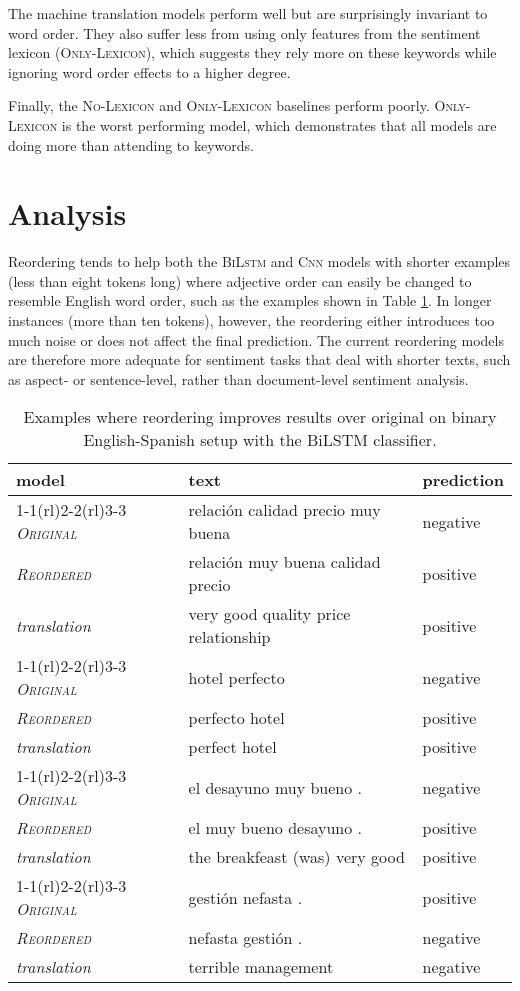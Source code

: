 \documentclass[11pt,a4paper]{article}
\newcommand{\original}{\textsc{Original}\xspace}
\newcommand{\mtreordered}{\textsc{Reordered}\xspace}
\newcommand{\onlylex}{\textsc{Only-Lexicon}\xspace}
\newcommand{\nolex}{\textsc{No-Lexicon}\xspace}
\newcommand{\bilstm}{\textsc{BiLstm}\xspace}
\newcommand{\cnn}{\textsc{Cnn}\xspace}
\begin{document}
The machine translation models perform well but are surprisingly invariant to word order. They also suffer less from using only features from the sentiment lexicon (\onlylex), which suggests they rely more on these keywords while ignoring word order effects to a higher degree.

Finally, the \nolex and \onlylex baselines perform poorly. \onlylex is the worst performing model, which demonstrates that all models are doing more than attending to keywords.



\section{Analysis}

Reordering tends to help both the \bilstm and \cnn models with shorter examples (less than eight tokens long) where adjective order can easily be changed to resemble English word order, such as the examples shown in Table \ref{helpful_examples}. In longer instances (more than ten tokens), however, the reordering either introduces too much noise or does not affect the final prediction. The current reordering models are therefore more adequate for sentiment tasks that deal with shorter texts, such as aspect- or sentence-level, rather than document-level sentiment analysis.

\begin{table}[]
\centering\scriptsize
\newcommand{\sepp}{\cmidrule(rl){1-1}\cmidrule(rl){2-2}\cmidrule(rl){3-3}}
\begin{tabular}{lll}
\toprule
model & text & prediction \\
\sepp
\emph{\original} & relación calidad precio muy buena & negative \\
\emph{\mtreordered} & relación muy buena calidad precio & positive \\
\textit{translation} & very good quality price relationship & positive \\
\sepp
\emph{\original} & hotel perfecto & negative \\
\emph{\mtreordered} & perfecto hotel & positive \\
\textit{translation} & perfect hotel & positive \\
\sepp
\emph{\original} & el desayuno muy bueno . & negative \\
\emph{\mtreordered} & el muy bueno desayuno . & positive \\
\textit{translation} & the breakfeast (was) very good & positive \\
\sepp
\emph{\original} & gestión nefasta . & positive \\
\emph{\mtreordered} & nefasta gestión . & negative \\
\textit{translation} & terrible management & negative \\
\bottomrule
\end{tabular}
\caption{Examples where reordering improves results over original on binary English-Spanish setup with the BiLSTM classifier.}
\label{helpful_examples}

\end{table}
\end{document}
